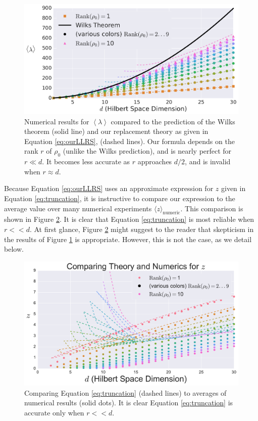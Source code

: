 \documentclass[aps,pra, twocolumn]{revtex4-1}
\newcommand{\expect}[1]{\ensuremath{\left\langle#1\right\rangle}}
\begin{document}
\begin{figure}[h]
 \includegraphics[width=\columnwidth]{Images/Figure_6.pdf}
 \caption{Numerical results for $\expect{\lambda}$ compared to the prediction of the Wilks theorem (solid line) and our replacement theory as given in Equation \eqref{eq:ourLLRS}, (dashed lines).  Our formula depends on the rank $r$ of $\rho_0$ (unlike the Wilks prediction), and is nearly perfect for $r\ll d$.  It becomes less accurate as $r$ approaches $d/2$, and is invalid when $r\approx d$.}
 \label{fig:modelcomp-iso}
\end{figure}

Because Equation \eqref{eq:ourLLRS} uses an approximate expression for $z$ given in Equation \eqref{eq:truncation}, it is instructive to compare our expression to the average value over many  numerical experiments $\langle z \rangle_{\mathrm{numeric}}$. This comparison is shown in Figure \ref{fig:modelcomp-iso-z}. It is clear that Equation \eqref{eq:truncation} is most reliable when $r << d$. At first glance, Figure \ref{fig:modelcomp-iso-z} might suggest to the reader that skepticism in the results of Figure \ref{fig:modelcomp-iso} is appropriate. However, this is not the case, as we detail below.


\begin{figure}[h]
 \includegraphics[width=\columnwidth]{Images/Figure_temp2.pdf}
 \caption{Comparing Equation \eqref{eq:truncation} (dashed lines) to averages of numerical results (solid dots). It is clear Equation \eqref{eq:truncation} is accurate only when $r << d$.}
 \label{fig:modelcomp-iso-z}
\end{figure}
\end{document}
